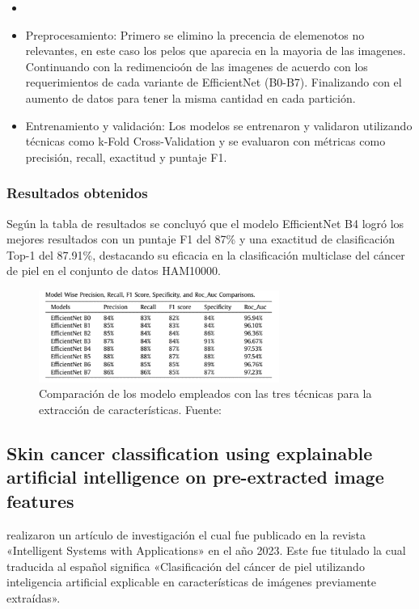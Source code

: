 \newcommand{\MEDMtwo}{ Preprocesamiento: Primero se elimino la precencia de elemenotos no relevantes, en este caso los pelos que aparecia en la mayoria de las imagenes. Continuando con la redimencioón de las imagenes de acuerdo con los requerimientos de cada variante de  EfficientNet (B0-B7). Finalizando con el aumento de datos para tener la misma cantidad en cada partición.}

\newcommand{\MEDMthree}{Entrenamiento y validación:
 Los modelos se entrenaron y validaron utilizando técnicas como k-Fold Cross-Validation y se evaluaron con métricas como precisión, recall, exactitud y puntaje F1.}



\begin{itemize}
	\item \MEDMone
	\item \MEDMtwo
	\item \MEDMthree
	
\end{itemize}

\subsubsection{Resultados obtenidos}

Según la tabla de resultados se concluyó que  el modelo EfficientNet B4 logró los mejores resultados con un puntaje F1 del 87\% y una exactitud de clasificación Top-1 del 87.91\%, destacando su eficacia en la clasificación multiclase del cáncer de piel en el conjunto de datos HAM10000.

\begin{figure}[h]
	\begin{center}
		\includegraphics[width=0.7\textwidth]{2/figuras/Multiclass_skin_cancer_imagen_01.png}
		\caption{Comparación de los modelo empleados con las  tres técnicas para la extracción de características. Fuente: \cite{ali_2022multiclass}}
		\label{1:fig}
	\end{center}
\end{figure}

\subsection{Skin cancer classification using explainable artificial intelligence on pre-extracted image features \citep*{khater2023skin}}
\citeauthor{khater2023skin} realizaron un artículo de investigación el cual fue publicado en la revista «Intelligent Systems with Applications» en el año 2023. Este fue titulado  la cual traducida al español significa «Clasificación del cáncer de piel utilizando inteligencia artificial explicable en características de imágenes previamente extraídas».


